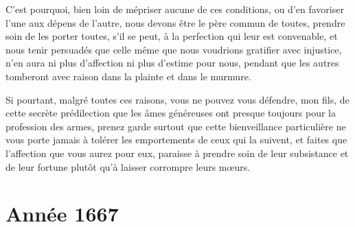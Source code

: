 \documentclass[french,twoside]{book} %
\begin{document}
C’est pourquoi, bien loin de mépriser aucune de ces conditions, ou d’en favoriser l’une aux dépens de l’autre, nous devons être le père commun de toutes, prendre soin de les porter toutes, s’il se peut, à la perfection qui leur est convenable, et nous tenir persuadés que celle même que nous voudrions gratifier avec injustice, n’en aura ni plus d’affection ni plus d’estime pour nous, pendant que les autres tomberont avec raison dans la plainte et dans le murmure.\par
Si pourtant, malgré toutes ces raisons, vous ne pouvez vous défendre, mon fils, de cette secrète prédilection que les âmes généreuses ont presque toujours pour la profession des armes, prenez garde surtout que cette bienveillance particulière ne vous porte jamais à tolérer les emportements de ceux qui la suivent, et faites que l’affection que vous aurez pour eux, paraisse à prendre soin de leur subsistance et de leur fortune plutôt qu’à laisser corrompre leurs mœurs.
\section[{Année 1667}]{Année 1667}\renewcommand{\leftmark}{Année 1667}
\end{document}
